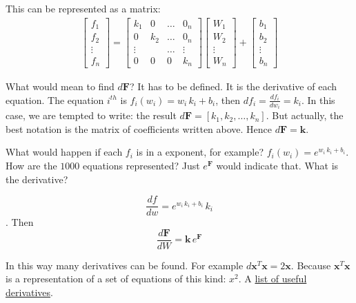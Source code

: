 This can be represented as a matrix:
\begin{align*}
\begin{bmatrix}
f_1\\
f_2\\
\vdots\\
f_n
\end{bmatrix}
=
\begin{bmatrix}
k_1 & 0 & \hdots & 0_n \\
0 & k_2 & \hdots & 0_n \\
\vdots & & \hdots & \vdots \\
0 & 0 & 0 & k_n
\end{bmatrix}
\begin{bmatrix}
W_1\\
W_2\\
\vdots\\
W_n
\end{bmatrix}
+
\begin{bmatrix}
b_1\\
b_2\\
\vdots\\
b_n
\end{bmatrix}
\end{align*}

What would mean to find $d\mathbf{F}$? It has to be defined. It is the derivative of each equation. The equation $i^{th}$ is $f_i(w_i) = w_i\,k_i + b_i$, then $df_i = \frac{df_i}{dw_i} = k_i$. In this case, we are tempted to write: the result $d\mathbf{F} = [k_1, k_2,\hdots, k_n]$. But actually, the best notation is the matrix of coefficients written above. Hence $d\mathbf{F} = \mathbf{k}$.

What would happen if each $f_i$ is in a exponent, for example? $f_i(w_i) =  e^{w_i\,k_i + b_i}$. How are the $1000$ equations represented? Just $e^\mathbf{F}$ would indicate that. What is the derivative?

\begin{equation*}\frac{df}{dw} = e^{w_i\,k_i + b_i}\, k_i\end{equation*}. Then $$\frac{d\mathbf{F}}{dW}= \mathbf{k} \, e^\mathbf{F}$$

  In this way many derivatives can be found. For example $d\mathbf{x}^T\mathbf{x} = 2 \mathbf{x}$. Because $\mathbf{x}^T\mathbf{x}$ is a representation of a set of equations of this kind: $x^2$. A \href{https://www.gatsby.ucl.ac.uk/teaching/courses/sntn/sntn-2017/resources/Matrix_derivatives_cribsheet.pdf}{list of useful derivatives}.
